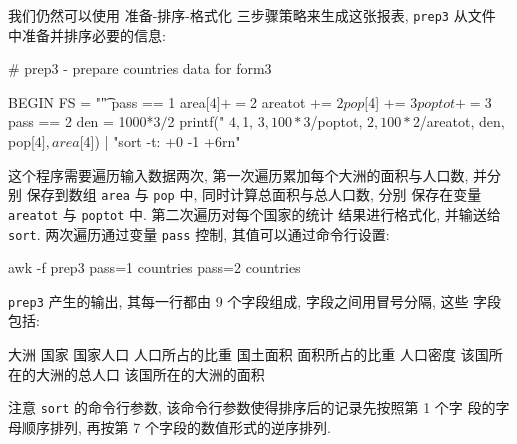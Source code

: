 我们仍然可以使用
\mbox{准备}-\mbox{排序}-\mbox{格式化}
三步骤策略来生成这张报表, \verb'prep3'
从文件  中准备并排序必要的信息:
\begin{awkcode}
    # prep3 - prepare countries data for form3

    BEGIN  { FS = "\t" }
    pass == 1 {
        area[$4] += $2
        areatot += $2
        pop[$4] += $3
        poptot += $3
    }
    pass == 2 {
        den = 1000*$3/$2
        printf("%
            $4, $1, $3, 100*$3/poptot, $2, 100*$2/areatot,
            den, pop[$4], area[$4]) | "sort -t: +0 -1 +6rn"
    }
\end{awkcode}
这个程序需要遍历输入数据两次, 第一次遍历累加每个大洲的面积与人口数, 并分别
保存到数组 \verb'area' 与 \verb'pop' 中, 同时计算总面积与总人口数, 分别
保存在变量 \verb'areatot' 与 \verb'poptot' 中. 第二次遍历对每个国家的统计
结果进行格式化, 并输送给 \verb'sort'. 
两次遍历通过变量 \verb'pass' 控制, 其值可以通过命令行设置:
\begin{awkcode}
    awk -f prep3 pass=1 countries pass=2 countries
\end{awkcode}
\verb'prep3' 产生的输出, 其每一行都由 9 个字段组成, 字段之间用冒号分隔,
这些 字段包括:
\begin{awkcode}
    大洲 
    国家
    国家人口 
    人口所占的比重
    国土面积 
    面积所占的比重
    人口密度
    该国所在的大洲的总人口
    该国所在的大洲的面积
\end{awkcode}
注意 \verb'sort' 的命令行参数, 该命令行参数使得排序后的记录先按照第 1 个字 
段的字母顺序排列, 再按第 7 个字段的数值形式的逆序排列. 

